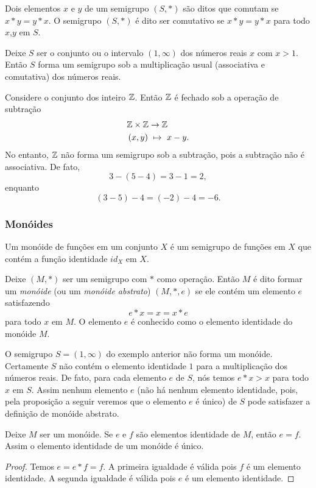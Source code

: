 \begin{definition}[Comutatividade]
  Dois elementos $x$ e $y$ de um semigrupo $(S, *)$ são ditos que comutam se $x* y = y* x$. O semigrupo $(S, *)$ é dito ser comutativo se $x* y = y * x$ para todo $x$,$y$ em $S$.
\end{definition}
\begin{exmp}
  Deixe $S$ ser o conjunto ou o intervalo $(1,\infty)$ dos números reais $x$ com $x > 1$. Então $S$ forma um semigrupo sob a multiplicação usual (associativa e comutativa) dos números reais.
\end{exmp}
\begin{exmp}
  Considere o conjunto dos inteiro $\mathbb{Z}$. Então $\mathbb{Z}$ é fechado sob a operação de subtração
  \begin{alignat}{2}
    &\mathbb{Z} \times \mathbb{Z} \to \mathbb{Z} \nonumber\\
    &\left(x,y\right)\ \mapsto\ x - y.
    \nonumber
  \end{alignat}
  No entanto, $\mathbb{Z}$ não forma um semigrupo sob a subtração, pois a subtração não é associativa. De fato, $$3-(5-4)=3-1=2,$$ enquanto $$(3-5)-4=(-2)-4=-6.$$
\end{exmp}

\subsubsection{Monóides}
Um monóide de funções em um conjunto $X$ é um semigrupo de funções em $X$ que contém a função identidade $id_{X}$ em $X$.
\begin{definition}
  Deixe $(M, *)$ ser um semigrupo com $*$ como operação. Então $M$ é dito formar um \emph{monóide} (ou um \emph{monóide abstrato}) $(M, *, e)$ se ele contém um elemento $e$ satisfazendo $$e * x = x = x * e$$ para todo $x$ em $M$. O elemento $e$ é conhecido como o elemento identidade do monóide $M$.
\end{definition}
\begin{exmp}
  O semigrupo $S = (1,\infty)$ do exemplo anterior não forma um monóide. Certamente $S$ não contém o elemento identidade $1$ para a multiplicação dos números reais. De fato, para cada elemento $e$ de $S$, nós temos $e * x > x$ para todo $x$ em $S$. Assim nenhum elemento $e$ (não há nenhum elemento identidade, pois, pela proposição a seguir veremos que o elemento $e$ é único) de $S$ pode satisfazer a definição de monóide abstrato.
\end{exmp}
\begin{stat}
  Deixe $M$ ser um monóide. Se $e$ e $f$ são elementos identidade de $M$, então $e=f$. Assim o elemento identidade de um monóide é único.
  \begin{proof}
    Temos $e=e* f = f$. A primeira igualdade é válida pois $f$ é um elemento identidade. A segunda igualdade é válida pois $e$ é um elemento identidade.
  \end{proof}
\end{stat}

